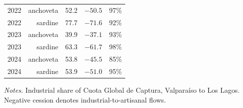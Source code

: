 \documentclass[
  11pt,
]{article}
\begin{document}
\begin{table}[H]
\begin{threeparttable}
\begin{tabular}{lrrrr}
2022 & anchoveta &  52.2 & $-50.5$ & 97\% \\
2022 & sardine   &  77.7 & $-71.6$ & 92\% \\
2023 & anchoveta &  39.9 & $-37.1$ & 93\% \\
2023 & sardine   &  63.3 & $-61.7$ & 98\% \\
2024 & anchoveta &  53.8 & $-45.5$ & 85\% \\
2024 & sardine   &  53.9 & $-51.0$ & 95\% \\
\bottomrule
\end{tabular}
\begin{tablenotes}[flushleft]\footnotesize
\item \emph{Notes.} Industrial share of Cuota Global de Captura, Valparaíso to Los Lagos. Negative cession denotes industrial-to-artisanal flows.
\end{tablenotes}
\end{threeparttable}
\end{table}
\end{document}
